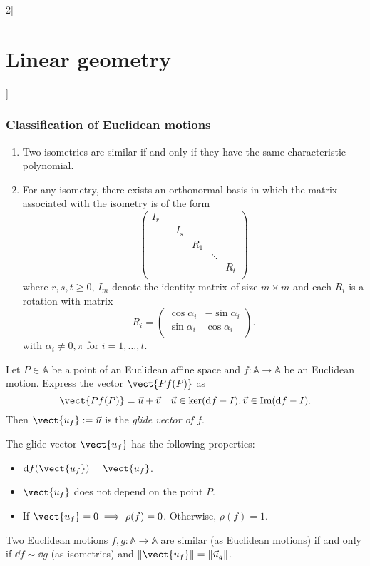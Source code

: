 \documentclass[../../../main.tex]{subfiles}
\begin{document}
\begin{multicols}{2}[\section{Linear geometry}]
\subsubsection*{Classification of Euclidean motions}
\begin{theorem}
\hfill
\begin{enumerate}
    \item Two isometries are similar if and only if they have the same characteristic polynomial.
    \item For any isometry, there exists an orthonormal basis in which the matrix associated with the isometry is of the form  $$\begin{pmatrix}
    I_r &&&&\\
    & -I_s &&&\\
    && R_1 &&\\
    &&& \ddots &\\
    &&&& R_t\\
    \end{pmatrix}$$ where $r,s,t\geq 0$, $I_m$ denote the identity matrix of size $m\times m$ and each $R_i$ is a rotation with matrix $$R_i=\begin{pmatrix}
    \cos\alpha_i & -\sin\alpha_i\\
    \sin\alpha_i & \cos\alpha_i\\
    \end{pmatrix}.$$ with $\alpha_i\ne0,\pi$ for $i=1,\ldots,t$.
\end{enumerate}
\end{theorem}
\begin{definition}
Let $P\in\mathbb{A}$ be a point of an Euclidean affine space and $f:\mathbb{A}\rightarrow\mathbb{A}$ be an Euclidean motion. Express the vector $\vect{Pf(P)}$ as $$\vect{Pf(P)}=\vec{u}+\vec{v}\quad\vec{u}\in\ker(\dd f-I),\vec{v}\in\text{Im}(\dd f-I).$$ Then $\vect{u_f}:=\vec{u}$ is the \textit{glide vector of $f$}.
\end{definition}
\begin{prop}
The glide vector $\vect{u_f}$ has the following properties:
\begin{itemize}
    \item $\dd f(\vect{u_f})=\vect{u_f}$.
    \item $\vect{u_f}$ does not depend on the point $P$.
    \item If $\vect{u_f}=0\implies\rho(f)=0$. Otherwise, $\rho(f)=1$.
\end{itemize}
\end{prop}
\begin{theorem}
Two Euclidean motions $f,g:\mathbb{A}\rightarrow\mathbb{A}$ are similar (as Euclidean motions) if and only if $\dd f\sim \dd g$ (as isometries) and $\|\vect{u_f}\|=\|\vec{u}_g\|$.
\end{theorem}

\end{multicols}
\end{document}
